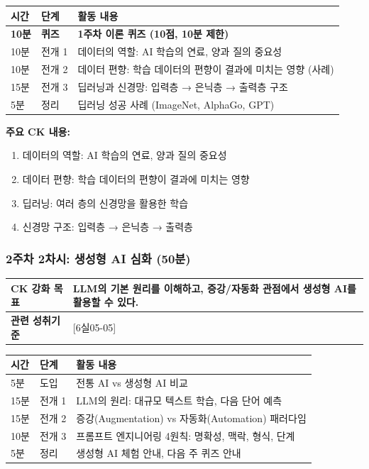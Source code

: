 \documentclass[a4paper,11pt]{article}
\begin{document}
\vspace{0.3em}\noindent
\begin{tabularx}{\textwidth}{|>{\centering\arraybackslash}p{1cm}|>{\centering\arraybackslash}p{1.5cm}|X|}
\hline
\textbf{시간} & \textbf{단계} & \textbf{활동 내용} \\ \hline
\textbf{10분} & \textbf{퀴즈} & \textbf{1주차 이론 퀴즈 (10점, 10분 제한)} \\ \hline
10분 & 전개 1 & 데이터의 역할: AI 학습의 연료, 양과 질의 중요성 \\ \hline
10분 & 전개 2 & 데이터 편향: 학습 데이터의 편향이 결과에 미치는 영향 (사례) \\ \hline
15분 & 전개 3 & 딥러닝과 신경망: 입력층 → 은닉층 → 출력층 구조 \\ \hline
5분 & 정리 & 딥러닝 성공 사례 (ImageNet, AlphaGo, GPT) \\ \hline
\end{tabularx}

\textbf{주요 CK 내용:}
\begin{enumerate}[nosep,start=10]
\item 데이터의 역할: AI 학습의 연료, 양과 질의 중요성
\item 데이터 편향: 학습 데이터의 편향이 결과에 미치는 영향
\item 딥러닝: 여러 층의 신경망을 활용한 학습
\item 신경망 구조: 입력층 → 은닉층 → 출력층
\end{enumerate}

\subsubsection{2주차 2차시: 생성형 AI 심화 (50분)}

\noindent
\begin{tabularx}{\textwidth}{|>{\bfseries\arraybackslash}p{2.5cm}|X|}
\hline
CK 강화 목표 & LLM의 기본 원리를 이해하고, 증강/자동화 관점에서 생성형 AI를 활용할 수 있다. \\ \hline
관련 성취기준 & {[6실05-05]} \\ \hline
\end{tabularx}

\vspace{0.3em}\noindent
\begin{tabularx}{\textwidth}{|>{\centering\arraybackslash}p{1cm}|>{\centering\arraybackslash}p{1.5cm}|X|}
\hline
\textbf{시간} & \textbf{단계} & \textbf{활동 내용} \\ \hline
5분 & 도입 & 전통 AI vs 생성형 AI 비교 \\ \hline
15분 & 전개 1 & LLM의 원리: 대규모 텍스트 학습, 다음 단어 예측 \\ \hline
15분 & 전개 2 & 증강(Augmentation) vs 자동화(Automation) 패러다임 \\ \hline
10분 & 전개 3 & 프롬프트 엔지니어링 4원칙: 명확성, 맥락, 형식, 단계 \\ \hline
5분 & 정리 & 생성형 AI 체험 안내, 다음 주 퀴즈 안내 \\ \hline
\end{tabularx}
\end{document}

